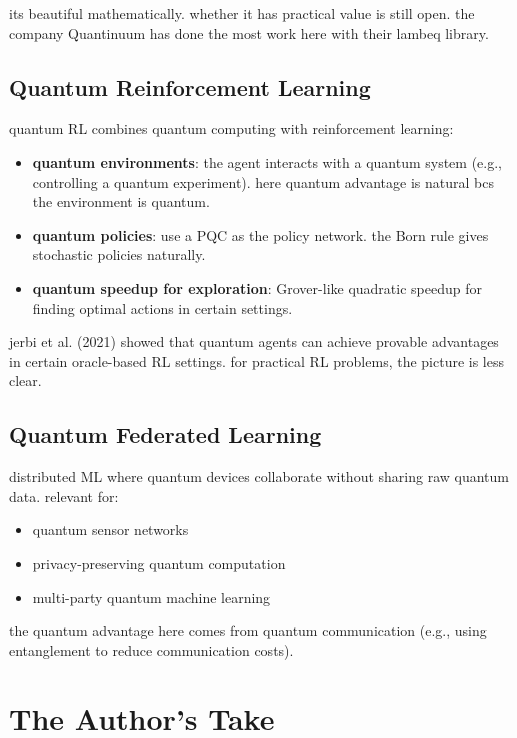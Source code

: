 \documentclass[11pt,a4paper]{article}
\theoremstyle{definition}
\theoremstyle{remark}
\begin{document}
its beautiful mathematically. whether it has practical value is still open. the company Quantinuum has done the most work here with their lambeq library.

\subsection{Quantum Reinforcement Learning}

quantum RL combines quantum computing with reinforcement learning:
\begin{itemize}[nosep]
    \item \textbf{quantum environments}: the agent interacts with a quantum system (e.g., controlling a quantum experiment). here quantum advantage is natural bcs the environment is quantum.
    \item \textbf{quantum policies}: use a PQC as the policy network. the Born rule gives stochastic policies naturally.
    \item \textbf{quantum speedup for exploration}: Grover-like quadratic speedup for finding optimal actions in certain settings.
\end{itemize}

jerbi et al. (2021) showed that quantum agents can achieve provable advantages in certain oracle-based RL settings. for practical RL problems, the picture is less clear.

\subsection{Quantum Federated Learning}

distributed ML where quantum devices collaborate without sharing raw quantum data. relevant for:
\begin{itemize}[nosep]
    \item quantum sensor networks
    \item privacy-preserving quantum computation
    \item multi-party quantum machine learning
\end{itemize}

the quantum advantage here comes from quantum communication (e.g., using entanglement to reduce communication costs).

\section{The Author's Take}
\end{document}
